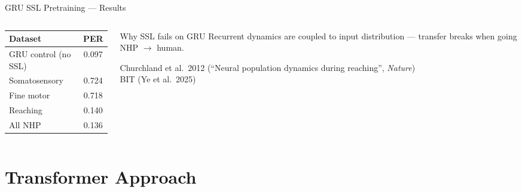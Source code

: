 \documentclass[aspectratio=169]{beamer}
\begin{document}
\begin{frame}{GRU SSL Pretraining — Results}
  \begin{columns}
    \begin{column}{0.5\textwidth}
      \begin{table}
        \centering
        \begin{tabular}{lc}
          \toprule
          \textbf{Dataset} & \textbf{PER} \\
          \midrule
          GRU control (no SSL) & 0.097 \\
          Somatosensory        & 0.724 \\
          Fine motor           & 0.718 \\
          Reaching             & 0.140 \\
          All NHP              & 0.136 \\
          \bottomrule
        \end{tabular}
      \end{table}
    \end{column}
    \begin{column}{0.45\textwidth}
      \begin{alertblock}{Why SSL fails on GRU}
        Recurrent dynamics are coupled to input distribution — transfer breaks when going NHP $\to$ human.
      \end{alertblock}
      \vspace{0.4em}
      \small
      Churchland et al.\ 2012 (``Neural population dynamics during reaching'', \textit{Nature}) \\
      BIT (Ye et al.\ 2025)
    \end{column}
  \end{columns}
\end{frame}

\section{Transformer Approach}
\end{document}
